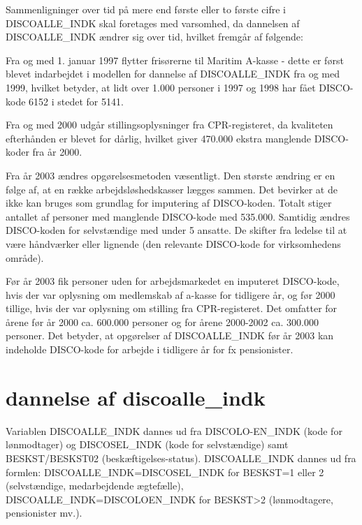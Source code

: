 Sammenligninger over tid på mere end første eller to første cifre i DISCOALLE\_INDK skal foretages med varsomhed, da dannelsen af DISCOALLE\_INDK ændrer sig over tid, hvilket fremgår af følgende:
\begin{description}
  \item Fra og med 1. januar 1997 flytter frisørerne til Maritim A-kasse - dette er først blevet indarbejdet i modellen for dannelse af DISCOALLE\_INDK fra og med 1999, hvilket betyder, at lidt over 1.000 personer i 1997 og 1998 har fået DISCO-kode 6152 i stedet for 5141.
  \item Fra og med 2000 udgår stillingsoplysninger fra CPR-registeret, da kvaliteten efterhånden er blevet for dårlig, hvilket giver 470.000 ekstra manglende DISCO-koder fra år 2000.
  \item Fra år 2003 ændres opgørelsesmetoden væsentligt. Den største ændring er en følge af, at en række arbejdsløshedskasser lægges sammen. Det bevirker at de ikke kan bruges som grundlag for imputering af DISCO-koden. Totalt stiger antallet af personer med manglende DISCO-kode med 535.000. Samtidig ændres DISCO-koden for selvstændige med under 5 ansatte. De skifter fra ledelse til at være håndværker eller lignende (den relevante DISCO-kode for virksomhedens område).
  \item Før år 2003 fik personer uden for arbejdsmarkedet en imputeret DISCO-kode, hvis der var oplysning om medlemskab af a-kasse for tidligere år, og før 2000 tillige, hvis der var oplysning om stilling fra CPR-registeret. Det omfatter for årene før år 2000 ca. 600.000 personer og for årene 2000-2002 ca. 300.000 personer. Det betyder, at opgørelser af DISCOALLE\_INDK før år 2003 kan indeholde DISCO-kode for arbejde i tidligere år for fx pensionister.
\end{description}
 

\section{dannelse af discoalle\_indk \label{}}

Variablen DISCOALLE\_INDK dannes ud fra DISCOLO-EN\_INDK (kode for lønmodtager) og DISCOSEL\_INDK (kode for selvstændige) samt BESKST/BESKST02 (beskæftigelses-status). DISCOALLE\_INDK dannes ud fra formlen: DISCOALLE\_INDK=DISCOSEL\_INDK for BESKST=1 eller 2 (selvstændige, medarbejdende ægtefælle), DISCOALLE\_INDK=DISCOLOEN\_INDK for BESKST>2 (lønmodtagere, pensionister mv.).

